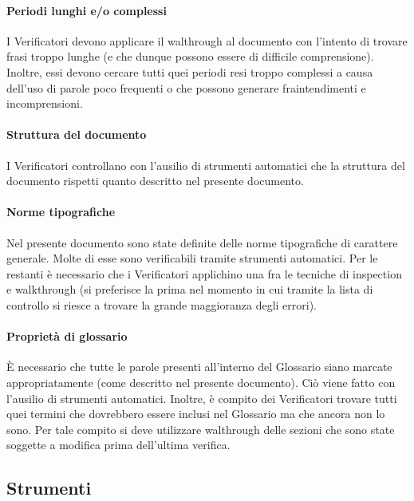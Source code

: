 			\paragraph{Periodi lunghi e/o complessi}
				I Verificatori devono applicare il walthrough al documento con l'intento di trovare frasi troppo lunghe (e che dunque possono essere di 
				difficile comprensione). Inoltre, essi devono cercare tutti quei periodi resi troppo complessi a causa dell'uso di parole poco frequenti o 
				che possono generare fraintendimenti e incomprensioni.
			\paragraph{Struttura del documento}
				I Verificatori controllano con l'ausilio di strumenti automatici che la struttura del documento rispetti quanto descritto nel presente 
				documento.
			\paragraph{Norme tipografiche}
				Nel presente documento sono state definite delle norme tipografiche di carattere generale. Molte di esse sono verificabili tramite 
				strumenti automatici. Per le restanti è necessario che i Verificatori applichino una fra le tecniche di inspection e walkthrough 
				(si preferisce la prima nel momento in cui tramite la lista di controllo si riesce a trovare la grande maggioranza degli errori).
			\paragraph{Proprietà di glossario}
				È necessario che tutte le parole presenti all'interno del Glossario siano marcate appropriatamente (come descritto nel presente 
				documento). Ciò viene fatto con l'ausilio di strumenti automatici. Inoltre, è compito dei Verificatori trovare tutti quei termini che 
				dovrebbero essere inclusi nel Glossario ma che ancora non lo sono. Per tale compito si deve utilizzare walthrough delle sezioni che sono 
				state soggette a modifica prima dell'ultima verifica.
	\subsection{Strumenti}
		